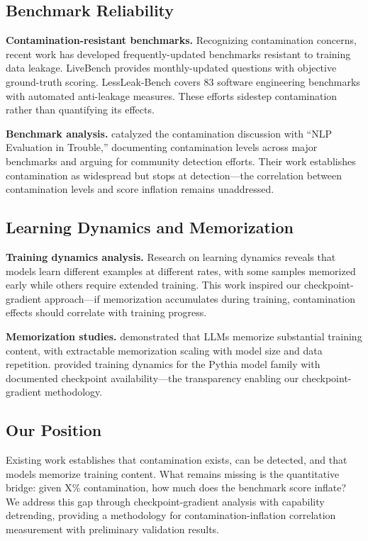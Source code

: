 \subsection{Benchmark Reliability}

\textbf{Contamination-resistant benchmarks.} Recognizing contamination concerns, recent work has developed frequently-updated benchmarks resistant to training data leakage. LiveBench \citep{white2024livebench} provides monthly-updated questions with objective ground-truth scoring. LessLeak-Bench \citep{zhou2025lessleak} covers 83 software engineering benchmarks with automated anti-leakage measures. These efforts sidestep contamination rather than quantifying its effects.

\textbf{Benchmark analysis.} \citet{sainz2023nlp} catalyzed the contamination discussion with ``NLP Evaluation in Trouble,'' documenting contamination levels across major benchmarks and arguing for community detection efforts. Their work establishes contamination as widespread but stops at detection---the correlation between contamination levels and score inflation remains unaddressed.

\subsection{Learning Dynamics and Memorization}

\textbf{Training dynamics analysis.} Research on learning dynamics \citep{swayamdipta2020dataset,toneva2019empirical} reveals that models learn different examples at different rates, with some samples memorized early while others require extended training. This work inspired our checkpoint-gradient approach---if memorization accumulates during training, contamination effects should correlate with training progress.

\textbf{Memorization studies.} \citet{carlini2023quantifying} demonstrated that LLMs memorize substantial training content, with extractable memorization scaling with model size and data repetition. \citet{biderman2023pythia} provided training dynamics for the Pythia model family with documented checkpoint availability---the transparency enabling our checkpoint-gradient methodology.

\subsection{Our Position}

Existing work establishes that contamination exists, can be detected, and that models memorize training content. What remains missing is the quantitative bridge: given X\% contamination, how much does the benchmark score inflate? We address this gap through checkpoint-gradient analysis with capability detrending, providing a methodology for contamination-inflation correlation measurement with preliminary validation results.
